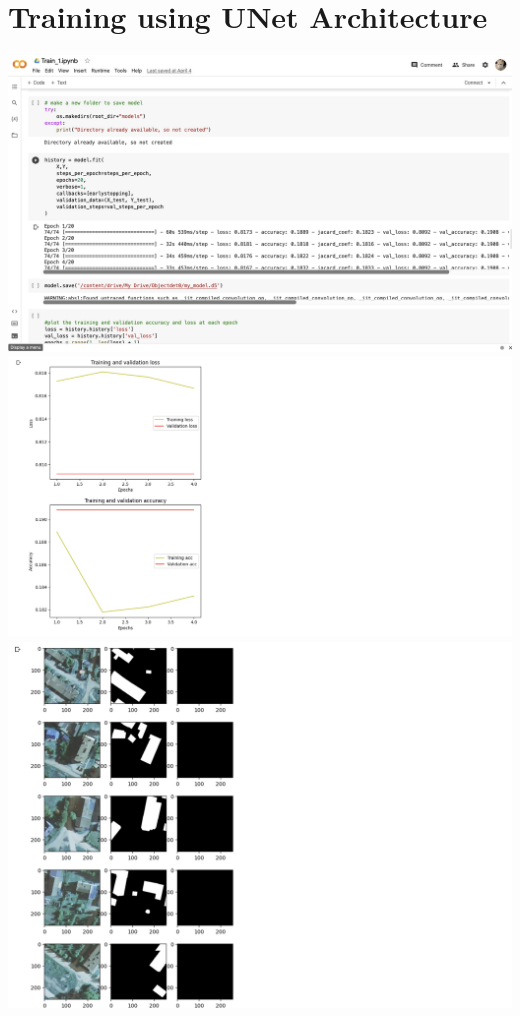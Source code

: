 \section{Training using UNet Architecture}
\includegraphics[scale=0.4]{screenshts/11.png}
\includegraphics[scale=0.4]{screenshts/12.png}
\includegraphics[scale=0.6]{screenshts/13.png}

